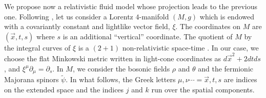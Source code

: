 \documentclass[11pt,a4paper]{article}
\begin{document}
We propose now a relativistic fluid model whose projection leads to the previous one. Following \cite{DBKP}, let us consider a Lorentz $4$-manifold $(M,g)$ which is endowed with a covariantly constant and lightlike vector field, $\xi$. The coordinates on $M$ are $(\vec{x},t,s)$ where $s$ is an additional ``vertical'' coordinate. The quotient of $M$ by the integral curves of $\xi$ is a $(2+1)$ non-relativistic space-time \cite{DBKP}. In our case, we choose the flat Minkowski metric written in light-cone coordinates as $d\vec{x}^2+2dtds$, and $\xi^\mu\partial_\mu=\partial_s$. In $M$, we consider the bosonic fields $\rho$ and $\theta$ and the fermionic Majorana spinors $\tilde{\psi}$. In what follows, the Greek letters $\mu, \nu\cdots=\vec{x}, t, s$ are indices on the extended space and the indices $j$ and $k$ run over the spatial components. 
\end{document}
